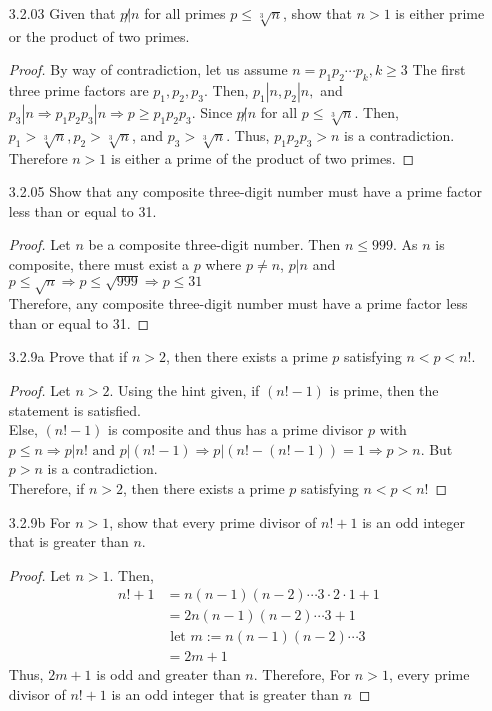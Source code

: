\documentclass[12pt]{article}
\begin{document}
\begin{enumerate}
	\item[3.2.03] Given that $ p \not | n $ for all primes $ p \leq \sqrt[3]{n} $, show that $ n > 1 $ is either prime or the product of two primes.
		\begin{proof}
			By way of contradiction, let us assume $ n=p_1p_2\cdots p_k , k\geq3$ The first three prime factors are $ p_1,p_2,p_3 $. Then, $ p_1 | n , p_2|n, $ and $ p_3|n \Rightarrow p_1p_2p_3|n\Rightarrow p\geq p_1p_2p_3$.
			Since $ p\not|n $ for all $ p\leq \sqrt[3]{n} $. Then, $ p_1>\sqrt[3]{n},p_2>\sqrt[3]{n} $, and $ p_3>\sqrt[3]{n} $. Thus, $ p_1p_2p_3>n $ is a contradiction.\\
			Therefore $ n>1 $ is either a prime of the product of two primes.
		\end{proof}
	\item[3.2.05] Show that any composite three-digit number must have a prime factor less than or equal to 31.
	\begin{proof}
		Let $ n $ be a composite three-digit number. Then $ n \leq 999 $. As $ n $ is composite, there must exist a $ p $ where $ p \not = n $, $ p|n $ and $ p\leq \sqrt{n}\Rightarrow p\leq\sqrt{999} \Rightarrow p\leq 31 $\\
		Therefore, any composite three-digit number must have a prime factor less than or equal to 31.
	\end{proof}
	
	\item[3.2.9a] Prove that if $ n >2 $, then there exists a prime $ p $ satisfying $ n < p <n! $.
		\begin{proof}
			Let $ n > 2 $. Using the hint given, if $ (n! - 1)  $ is prime, then the statement is satisfied. \\
			Else, $ (n! - 1) $ is composite and thus has a prime divisor $ p $ with $ p\leq n \Rightarrow p|n! \text{ and } p|(n!-1) \Rightarrow p|(n!-(n!-1))=1 \Rightarrow p > n$. But $ p > n $ is a contradiction. \\
			Therefore, if $ n >2 $, then there exists a prime $ p $ satisfying $ n < p <n! $
		\end{proof}
	\item[3.2.9b] For $ n > 1 $, show that every prime divisor of $ n! + 1 $ is an odd integer that is greater than $ n $.
	\begin{proof}
		Let $ n > 1 $. Then,
		\begin{align*}
			n! + 1 &= n(n-1)(n-2)\cdots 3 \cdot 2 \cdot 1 + 1\\
				   &= 2n(n-1)(n-2)\cdots 3 + 1\\
				   &\text{ let } m:=n(n-1)(n-2)\cdots 3 \\
				   &= 2m+1
		\end{align*}
		Thus, $ 2m+1 $ is odd and greater than $ n $.
		Therefore,  For $ n > 1 $, every prime divisor of $ n! + 1 $ is an odd integer that is greater than $ n $
	\end{proof}
\end{enumerate}
\end{document}

